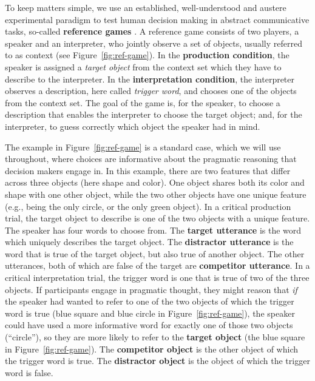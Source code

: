 \documentclass{article}
\begin{document}
To keep matters simple, we use an established, well-understood and austere experimental paradigm to test human decision making in abstract communicative tasks, so-called \textbf{reference games} \citep[e.g.,][]{FrankGoodman2012:Predicting-Prag,DegenFranke2013:Cost-Based-Prag,QingFranke2013:Variations-on-a,Frank2016:Rational-speech,SikosVenhuizen2021:Reevaluating-pr}.
A reference game consists of two players, a speaker and an interpreter, who jointly observe a set of objects, usually referred to as context (see Figure~\ref{fig:ref-game}).
In the \textbf{production condition}, the speaker is assigned a \emph{target object} from the context set which they have to describe to the interpreter.
In the \textbf{interpretation condition}, the interpreter observes a description, here called \emph{trigger word}, and chooses one of the objects from the context set.
The goal of the game is, for the speaker, to choose a description that enables the interpreter to choose the target object; and, for the interpreter, to guess correctly which object the speaker had in mind.

The example in Figure~\ref{fig:ref-game} is a standard case, which we will use throughout, where choices are informative about the pragmatic reasoning that decision makers engage in.
In this example, there are two features that differ across three objects (here shape and color).
One object shares both its color and shape with one other object, while the two other objects have one unique feature (e.g., being the only circle, or the only green object).
%
In a critical production trial, the target object to describe is one of the two objects with a unique feature.
The speaker has four words to choose from.
The \textbf{target utterance} is the word which uniquely describes the target object.
The \textbf{distractor utterance} is the word that is true of the target object, but also true of another object.
The other utterances, both of which are false of the target are \textbf{competitor utterance}.
%
In a critical interpretation trial, the trigger word is one that is true of two of the three objects.
If participants engage in pragmatic thought, they might reason that \emph{if} the speaker had wanted to refer to one of the two objects of which the trigger word is true (blue square and blue circle in Figure~\ref{fig:ref-game}), the speaker could have used a more informative word for exactly one of those two objects (``circle''), so they are more likely to refer to the \textbf{target object} (the blue square in Figure~\ref{fig:ref-game}).
The \textbf{competitor object} is the other object of which the trigger word is true.
The \textbf{distractor object} is the object of which the trigger word is false.
\end{document}

